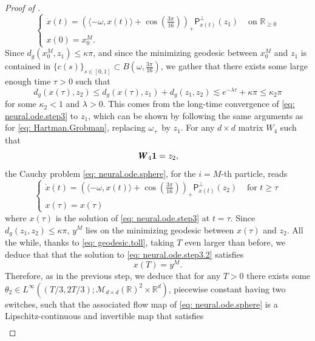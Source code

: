 \documentclass[a4paper,11pt]{article}
\theoremstyle{plain}
\newcommand{\R}{\mathbb{R}}
\newcommand{\proj}{\bm{\mathsf{P}}^\perp}
\newcommand{\bW}{\bm{\mathit{W}}}
\renewcommand{\leq}{\leqslant}
\renewcommand{\geq}{\geqslant}
\numberwithin{equation}{section}
\begin{document}
\begin{proof}[Proof of ]
\begin{equation}
\begin{cases}
\dot{x}(t)=\left(\langle -\omega, x(t)\rangle+\cos\left(\frac{3\pi}{16}\right)\right)_+\proj_{x(t)}(z_1) &\text{ on } \R_{\geq0}\\
x(0)=x_0^M.
\end{cases}
\end{equation}
Since $d_g(x_0^M,z_1)\leq\kappa\pi$, and since the minimizing geodesic between $x_0^M$ and $z_1$ is contained in $\{c(s)\}_{s\in [0,1]}\subset B(\omega, \frac{3\pi}{16})$, we gather that there exists some large enough time $\tau>0$ such that
\begin{equation} \label{eq: geodesic.toll}
    d_g\left( x(\tau),z_2\right)\leq d_g\left( x(\tau),z_1\right)+d_g\left( z_1,z_2\right)\lesssim e^{-\lambda\tau}+\kappa\pi\leq\kappa_2\pi
\end{equation}
for some $\kappa_2<1$ and $\lambda>0$. This comes from the long-time convergence of \eqref{eq: neural.ode.step3} to $z_1$, which can be shown by following the same arguments as for \eqref{eq: Hartman.Grobman}, replacing $\omega_+$ by $z_1$. 
For any $d\times d$ matrix $\bW_4$ such that
\begin{equation*}
\bW_4{\bf1}=z_2,
\end{equation*}
the Cauchy problem \eqref{eq: neural.ode.sphere}, for the $i=M$-th particle, reads
\begin{equation} \label{eq: neural.ode.step3.2}
\begin{cases}
\dot{x}(t)=\left(\langle -\omega, x(t)\rangle+\cos\left(\frac{3\pi}{16}\right)\right)_+\proj_{x(t)}(z_2) &\text{ for } t\geq\tau\\
x(\tau) = x(\tau)
\end{cases}
\end{equation}
where $x(\tau)$ is the solution of \eqref{eq: neural.ode.step3} at $t=\tau$. Since $d_g(z_1,z_2)\leq \kappa \pi$, $y^M$ lies on the minimizing geodesic between $x(\tau)$ and $z_2$. All the while, thanks to \eqref{eq: geodesic.toll}, taking $T$ even larger than before, we deduce that that the solution to \eqref{eq: neural.ode.step3.2} satisfies
\begin{equation*}
    x(T)=y^M.
\end{equation*}
Therefore, as in the previous step, we deduce that for any $T>0$ there exists some $\theta_2\in L^\infty((T/3,2T/3);\mathscr{M}_{d\times d}(\mathbb{R})^2\times\mathbb{R}^d)$, piecewise constant having two switches, such that the associated flow map of \eqref{eq: neural.ode.sphere} is a Lipschitz-continuous and invertible map that satisfies
\begin{align*}

\end{align*}
\end{proof}
\end{document}
